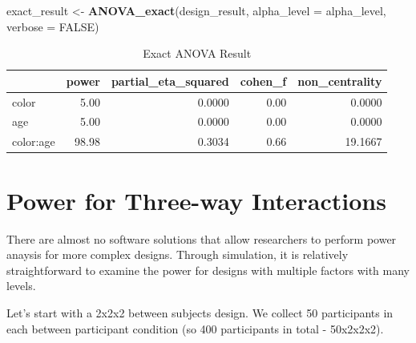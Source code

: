 \documentclass[]{book}
\newenvironment{Shaded}{\begin{snugshade}}{\end{snugshade}}
\newcommand{\DataTypeTok}[1]{\textcolor[rgb]{0.13,0.29,0.53}{#1}}
\newcommand{\KeywordTok}[1]{\textcolor[rgb]{0.13,0.29,0.53}{\textbf{#1}}}
\newcommand{\NormalTok}[1]{#1}
\newcommand{\OtherTok}[1]{\textcolor[rgb]{0.56,0.35,0.01}{#1}}
\newcommand{\StringTok}[1]{\textcolor[rgb]{0.31,0.60,0.02}{#1}}
\begin{document}
\begin{Shaded}
\begin{Highlighting}[]
\NormalTok{exact_result <-}\StringTok{ }\KeywordTok{ANOVA_exact}\NormalTok{(design_result,}
                            \DataTypeTok{alpha_level =}\NormalTok{ alpha_level,}
                            \DataTypeTok{verbose =} \OtherTok{FALSE}\NormalTok{)}
\end{Highlighting}
\end{Shaded}

\begin{table}[!h]

\caption{\label{tab:unnamed-chunk-179}Exact ANOVA Result}
\centering
\begin{tabular}{l|r|r|r|r}
\hline
  & power & partial\_eta\_squared & cohen\_f & non\_centrality\\
\hline
color & 5.00 & 0.0000 & 0.00 & 0.0000\\
\hline
age & 5.00 & 0.0000 & 0.00 & 0.0000\\
\hline
color:age & 98.98 & 0.3034 & 0.66 & 19.1667\\
\hline
\end{tabular}
\end{table}

\hypertarget{power-for-three-way-interactions}{%
\chapter{Power for Three-way Interactions}\label{power-for-three-way-interactions}}

There are almost no software solutions that allow researchers to perform power anaysis for more complex designs. Through simulation, it is relatively straightforward to examine the power for designs with multiple factors with many levels.

Let's start with a 2x2x2 between subjects design. We collect 50 participants in each between participant condition (so 400 participants in total - 50x2x2x2).
\end{document}
